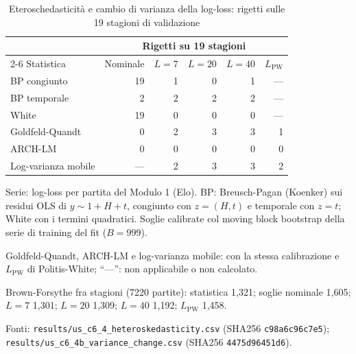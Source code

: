 \begin{table}[htbp]
\centering
\small
\caption{Eteroschedasticità e cambio di varianza della log-loss: rigetti sulle 19 stagioni di validazione}
\label{tab:eteroschedasticita}
\begin{tabular}{lrrrrr}
\toprule
 & \multicolumn{5}{c}{Rigetti su 19 stagioni} \\
\cmidrule(lr){2-6}
Statistica & Nominale & $L = 7$ & $L = 20$ & $L = 40$ & $L_{\mathrm{PW}}$ \\
\midrule
BP congiunto & 19 & 1 & 0 & 1 & --- \\
BP temporale & 2 & 2 & 2 & 2 & --- \\
White & 19 & 0 & 0 & 0 & --- \\
Goldfeld-Quandt & 0 & 2 & 3 & 3 & 1 \\
ARCH-LM & 0 & 0 & 0 & 0 & 0 \\
Log-varianza mobile & --- & 2 & 3 & 3 & 2 \\
\bottomrule
\end{tabular}

\smallskip
\begin{minipage}{\linewidth}
\footnotesize
Serie: log-loss per partita del Modulo 1 (Elo). BP: Breusch-Pagan (Koenker) sui residui OLS di $y \sim 1 + H + t$, congiunto con $z = (H, t)$ e temporale con $z = t$; White con i termini quadratici. Soglie calibrate col moving block bootstrap della serie di training del fit ($B = 999$).\par
Goldfeld-Quandt, ARCH-LM e log-varianza mobile: con la stessa calibrazione e $L_{\mathrm{PW}}$ di Politis-White; ``---'': non applicabile o non calcolato.\par
Brown-Forsythe fra stagioni (7220 partite): statistica 1,321; soglie nominale 1,605; $L = 7$ 1,301; $L = 20$ 1,309; $L = 40$ 1,192; $L_{\mathrm{PW}}$ 1,458.\par
Fonti: \texttt{results/us\_c6\_4\_heteroskedasticity.csv} (SHA256 \texttt{c98a6c96c7e5}); \texttt{results/us\_c6\_4b\_variance\_change.csv} (SHA256 \texttt{4475d96451d6}).
\end{minipage}
\end{table}
